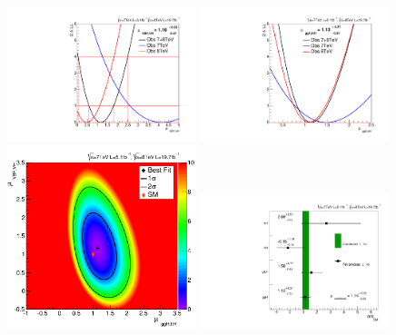 \begin{figure}
  \includegraphics[width=0.49\textwidth]{results/plots/mva_rv_scan.pdf}
  \includegraphics[width=0.49\textwidth]{results/plots/mva_rf_scan.pdf} \\
  \includegraphics[width=0.49\textwidth]{results/plots/mva_rvrf_scan.png}
  \includegraphics[width=0.49\textwidth]{results/plots/mva_proc_scan.pdf}

\end{figure}

